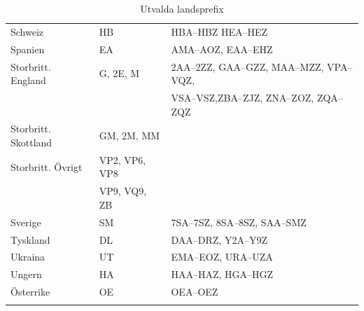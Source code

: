 \begin{center}
\begin{small}
\begin{longtable}{lll}
			Schweiz              & HB             & HBA--HBZ HEA--HEZ                                 \\
			Spanien              & EA             & AMA--AOZ, EAA--EHZ                                \\
			Storbritt. England   & G, 2E, M       & 2AA--2ZZ, GAA--GZZ, MAA--MZZ, VPA--VQZ,           \\
			                     &                & VSA--VSZ,ZBA--ZJZ, ZNA--ZOZ, ZQA--ZQZ             \\
			Storbritt. Skottland & GM, 2M, MM     &                                                   \\
			Storbritt. Övrigt    & VP2, VP6, VP8  &                                                   \\
			                     & VP9, VQ9, ZB   &                                                   \\
			Sverige              & SM             & 7SA--7SZ, 8SA--8SZ, SAA--SMZ                      \\
			Tyskland             & DL             & DAA--DRZ, Y2A--Y9Z                                \\
			Ukraina              & UT             & EMA--EOZ, URA--UZA                                \\
			Ungern               & HA             & HAA--HAZ, HGA--HGZ                                \\
			Österrike            & OE             & OEA--OEZ                                          \\
        \caption{Utvalda landsprefix}
    \end{longtable}
	\end{small}
\end{center}
